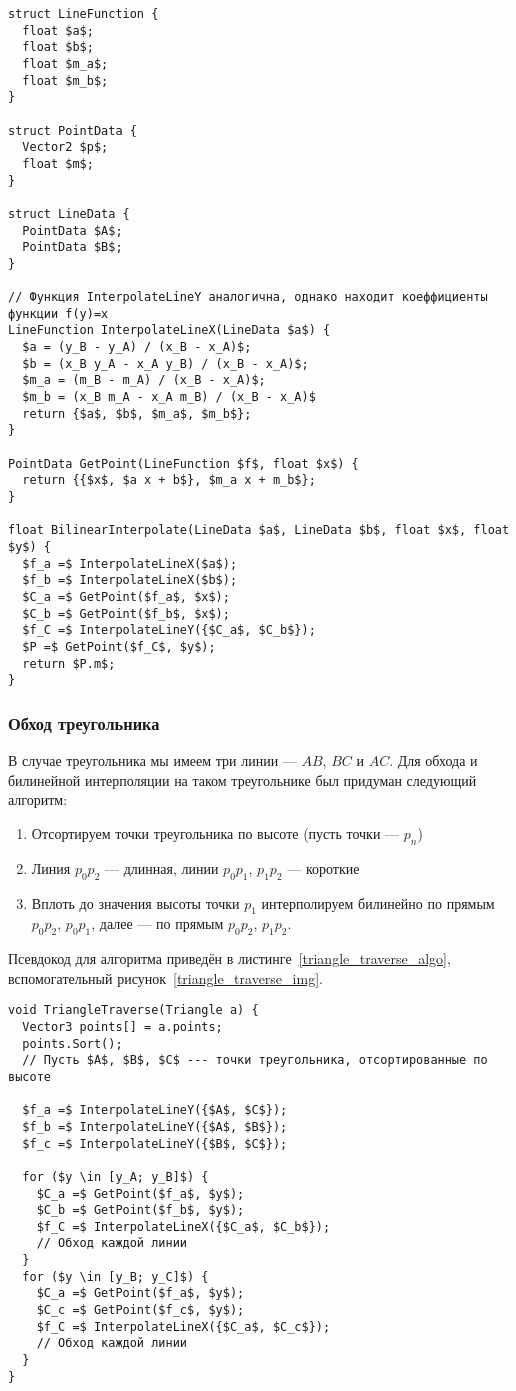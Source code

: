 \documentclass[a4paper,12pt]{report}
\numberwithin{equation}{section}
\begin{document}
\begin{lstlisting}[float=!h,caption={Билинейная интерполяция},label=bilinear_interpolation_algo]
struct LineFunction {
  float $a$;
  float $b$;
  float $m_a$;
  float $m_b$;
}

struct PointData {
  Vector2 $p$;
  float $m$;
}

struct LineData {
  PointData $A$;
  PointData $B$;
}

// Функция InterpolateLineY аналогична, однако находит коеффициенты функции f(y)=x
LineFunction InterpolateLineX(LineData $a$) {
  $a = (y_B - y_A) / (x_B - x_A)$;
  $b = (x_B y_A - x_A y_B) / (x_B - x_A)$;
  $m_a = (m_B - m_A) / (x_B - x_A)$;
  $m_b = (x_B m_A - x_A m_B) / (x_B - x_A)$
  return {$a$, $b$, $m_a$, $m_b$};
}

PointData GetPoint(LineFunction $f$, float $x$) {
  return {{$x$, $a x + b$}, $m_a x + m_b$};
}

float BilinearInterpolate(LineData $a$, LineData $b$, float $x$, float $y$) {
  $f_a =$ InterpolateLineX($a$);
  $f_b =$ InterpolateLineX($b$);
  $C_a =$ GetPoint($f_a$, $x$);
  $C_b =$ GetPoint($f_b$, $x$);
  $f_C =$ InterpolateLineY({$C_a$, $C_b$});
  $P =$ GetPoint($f_C$, $y$);
  return $P.m$;
}
\end{lstlisting}

\subsubsection{Обход треугольника}
В случае треугольника мы имеем три линии --- $AB$, $BC$ и $AC$. Для обхода и билинейной интерполяции на таком треугольнике был придуман следующий алгоритм:
\begin{enumerate}
\item Отсортируем точки треугольника по высоте (пусть точки --- $p_n$)
\item Линия $p_0 p_2$ --- длинная, линии $p_0 p_1$, $p_1 p_2$ --- короткие
\item Вплоть до значения высоты точки $p_1$ интерполируем билинейно по прямым $p_0 p_2$, $p_0 p_1$, далее --- по прямым $p_0 p_2$, $p_1 p_2$.
\end{enumerate}
Псевдокод для алгоритма приведён в листинге~\ref{triangle_traverse_algo}, вспомогательный рисунок~\ref{triangle_traverse_img}.

\begin{lstlisting}[float=h!,caption={Обход треугольника},label=triangle_traverse_algo]
void TriangleTraverse(Triangle a) {
  Vector3 points[] = a.points;
  points.Sort();
  // Пусть $A$, $B$, $C$ --- точки треугольника, отсортированные по высоте
  
  $f_a =$ InterpolateLineY({$A$, $C$});
  $f_b =$ InterpolateLineY({$A$, $B$});
  $f_c =$ InterpolateLineY({$B$, $C$});
  
  for ($y \in [y_A; y_B]$) {
    $C_a =$ GetPoint($f_a$, $y$);
    $C_b =$ GetPoint($f_b$, $y$);
    $f_C =$ InterpolateLineX({$C_a$, $C_b$});
    // Обход каждой линии
  }
  for ($y \in [y_B; y_C]$) {
    $C_a =$ GetPoint($f_a$, $y$);
    $C_c =$ GetPoint($f_c$, $y$);
    $f_C =$ InterpolateLineX({$C_a$, $C_c$});
    // Обход каждой линии
  }
}
\end{lstlisting}
\end{document}
